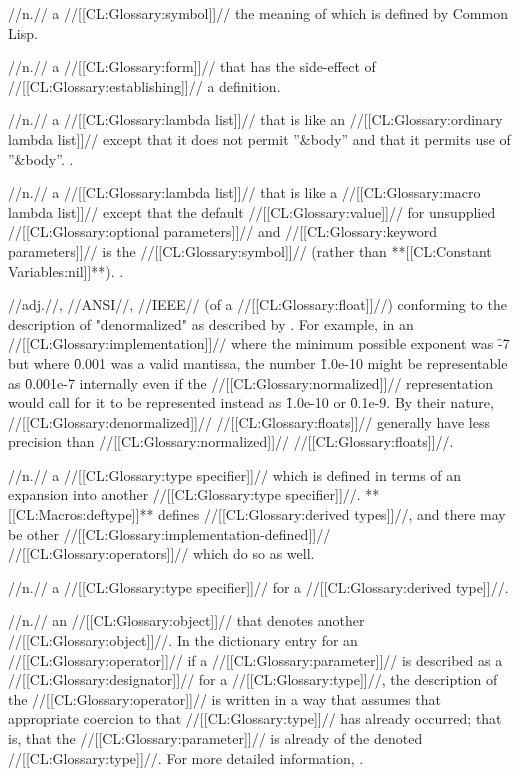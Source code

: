 //n.// a //[[CL:Glossary:symbol]]// the meaning of which is defined by Common Lisp.

 //n.// a //[[CL:Glossary:form]]// that has the side-effect of //[[CL:Glossary:establishing]]// a definition. 

 //n.// a //[[CL:Glossary:lambda list]]// that is like an //[[CL:Glossary:ordinary lambda list]]// except that it does not permit ''&body'' and that it permits use of ''&body''. \Seesection\DefsetfLambdaLists.

 //n.// a //[[CL:Glossary:lambda list]]// that is like a //[[CL:Glossary:macro lambda list]]// except that the default //[[CL:Glossary:value]]// for unsupplied //[[CL:Glossary:optional parameters]]// and //[[CL:Glossary:keyword parameters]]// is the //[[CL:Glossary:symbol]]// \misc{*} (rather than **[[CL:Constant Variables:nil]]**). \Seesection\DeftypeLambdaLists.

 //adj.//, //ANSI//, //IEEE// (of a //[[CL:Glossary:float]]//) conforming to the description of "denormalized" as described by {\IEEEFloatingPoint}. For example, in an //[[CL:Glossary:implementation]]// where the minimum possible exponent was \f{-7} but where \f{0.001} was a valid mantissa, the number \f{1.0e-10} might be representable as \f{0.001e-7} internally even if the //[[CL:Glossary:normalized]]// representation would call for it to be represented instead as \f{1.0e-10} or \f{0.1e-9}. By their nature, //[[CL:Glossary:denormalized]]// //[[CL:Glossary:floats]]// generally have less precision than //[[CL:Glossary:normalized]]// //[[CL:Glossary:floats]]//.

 //n.// a //[[CL:Glossary:type specifier]]// which is defined in terms of an expansion into another //[[CL:Glossary:type specifier]]//. **[[CL:Macros:deftype]]** defines //[[CL:Glossary:derived types]]//, and there may be other //[[CL:Glossary:implementation-defined]]// //[[CL:Glossary:operators]]// which do so as well.

 //n.// a //[[CL:Glossary:type specifier]]// for a //[[CL:Glossary:derived type]]//.

 //n.// an //[[CL:Glossary:object]]// that denotes another //[[CL:Glossary:object]]//. In the dictionary entry for an //[[CL:Glossary:operator]]// if a //[[CL:Glossary:parameter]]// is described as a //[[CL:Glossary:designator]]// for a //[[CL:Glossary:type]]//, the description of the //[[CL:Glossary:operator]]// is written in a way that assumes that appropriate coercion to that //[[CL:Glossary:type]]// has already occurred; that is, that the //[[CL:Glossary:parameter]]// is already of the denoted //[[CL:Glossary:type]]//. For more detailed information, \seesection\Designators.

